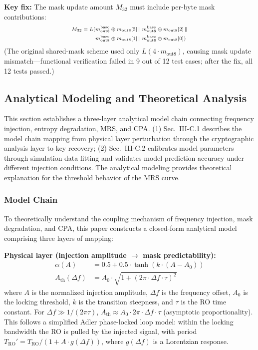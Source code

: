 \documentclass[journal]{IEEEtran}
\begin{document}
\textbf{Key fix:} The mask update amount $M_{32}$ must include per-byte mask contributions:
\begin{equation}\scriptsize
\begin{split}
M_{32} = L(&m_{\text{out8}}^{\text{base}} \oplus m_{\text{out8}}[3] \,\|\, m_{\text{out8}}^{\text{base}} \oplus m_{\text{out8}}[2] \,\| \\
&m_{\text{out8}}^{\text{base}} \oplus m_{\text{out8}}[1] \,\|\, m_{\text{out8}}^{\text{base}} \oplus m_{\text{out8}}[0])
\end{split}
\end{equation}
(The original shared-mask scheme used only $L(4 \cdot m_{\text{out8}})$, causing mask update mismatch---functional verification failed in 9 out of 12 test cases; after the fix, all 12 tests passed.)

\subsection{Analytical Modeling and Theoretical Analysis}

This section establishes a three-layer analytical model chain connecting frequency injection, entropy degradation, MRS, and CPA. (1) Sec.~III-C.1 describes the model chain mapping from physical layer perturbation through the cryptographic analysis layer to key recovery; (2) Sec.~III-C.2 calibrates model parameters through simulation data fitting and validates model prediction accuracy under different injection conditions. The analytical modeling provides theoretical explanation for the threshold behavior of the MRS curve.

\subsubsection{Model Chain}

To theoretically understand the coupling mechanism of frequency injection, mask degradation, and CPA, this paper constructs a closed-form analytical model comprising three layers of mapping:

\textbf{Physical layer (injection amplitude $\rightarrow$ mask predictability):}
\begin{align}
\alpha(A) &= 0.5 + 0.5 \cdot \tanh(k \cdot (A - A_0)) \\
A_{\text{th}}(\Delta f) &= A_0 \cdot \sqrt{1 + (2\pi \cdot \Delta f \cdot \tau)^2}
\end{align}
where $A$ is the normalized injection amplitude, $\Delta f$ is the frequency offset, $A_0$ is the locking threshold, $k$ is the transition steepness, and $\tau$ is the RO time constant. For $\Delta f \gg 1/(2\pi\tau)$, $A_{\text{th}} \approx A_0 \cdot 2\pi \cdot \Delta f \cdot \tau$ (asymptotic proportionality). This follows a simplified Adler phase-locked loop model: within the locking bandwidth the RO is pulled by the injected signal, with period $T_{\text{RO}}' = T_{\text{RO}}/(1+A \cdot g(\Delta f))$, where $g(\Delta f)$ is a Lorentzian response.
\end{document}
